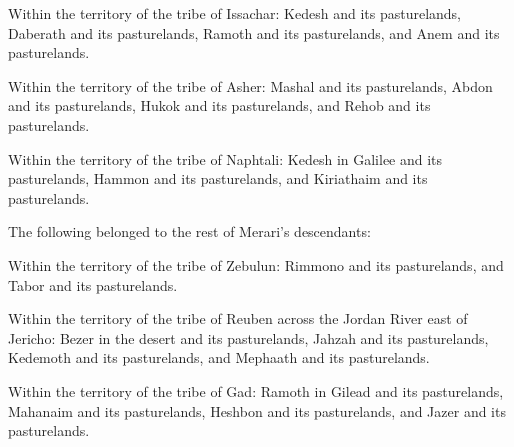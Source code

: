 {\par }{\PP {}Within the territory of the tribe
of Issachar: Kedesh
and its pasturelands,
Daberath
and its pasturelands,
Ramoth
and its
pasturelands,
and Anem
and its pasturelands.
\par }{\PP {}Within the territory of the tribe
of Asher: Mashal
and its pasturelands,
Abdon
and its pasturelands,
Hukok
and its pasturelands,
and Rehob
and its pasturelands.
\par }{\PP {}Within the territory of the tribe
of Naphtali: Kedesh
in Galilee
and its
pasturelands,
Hammon
and its
pasturelands,
and Kiriathaim
and its
pasturelands.
\par }{\PP {}The following belonged to the rest
of Merari’s
descendants:
\par }{\PP Within the territory of the tribe
of Zebulun: Rimmono
and its pasturelands,
and Tabor
and its pasturelands.
\par }{\PP {}Within the territory of the tribe
of Reuben
across
the Jordan River
east
of Jericho: Bezer
in the desert
and its pasturelands,
Jahzah
and its pasturelands,
Kedemoth
and its pasturelands,
and Mephaath
and its pasturelands.
\par }{\PP {}Within the territory of the tribe
of Gad: Ramoth
in Gilead
and its pasturelands,
Mahanaim
and its pasturelands,
Heshbon
and its
pasturelands,
and Jazer
and its pasturelands.

}
